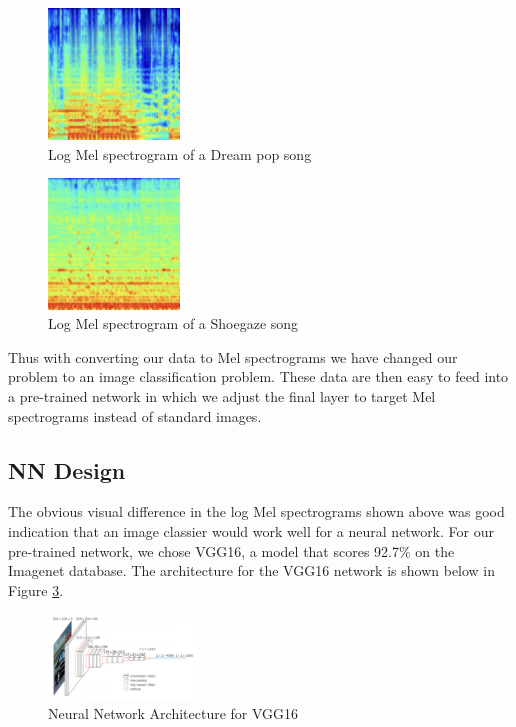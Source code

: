 \documentclass[letterpaper, 12 pt, conference]{ieeeconf}  %
\begin{document}
\begin{figure}[!ht]
\begin{center}
    \includegraphics[width=3.5cm]{dreampop_spectrogram.png}
\caption{Log Mel spectrogram of a Dream pop song}
\label{fig:meldreampop}
\end{center}

\end{figure}


\begin{figure}[!ht]
\begin{center}
    \includegraphics[width=3.5cm]{shoegaze_spectrogram.png}
\caption{Log Mel spectrogram of a Shoegaze song}
\label{fig:melshoegaze}
\end{center}
\end{figure}


Thus with converting our data to Mel spectrograms we have changed our problem to an image classification problem. These data are then easy to feed into a pre-trained network in which we adjust the final layer to target Mel spectrograms instead of standard images. 

\subsection{NN Design}

The obvious visual difference in the log Mel spectrograms shown above was good indication that an image classier would work well for a neural network. For our pre-trained network, we chose VGG16, a model that scores 92.7\% on the Imagenet database. The architecture for the VGG16 network is shown below in Figure \ref{fig:vgg16}.

\begin{figure}[!ht]
\begin{center}
    \includegraphics[width=4cm]{VGG16acc.png}
\caption{Neural Network Architecture for VGG16}
\label{fig:vgg16}
\end{center}
\end{figure}
\end{document}
